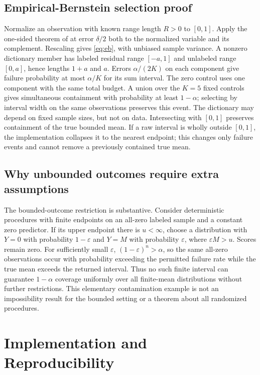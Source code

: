 \documentclass{article}
\begin{document}
\subsection{Empirical-Bernstein selection proof}
Normalize an observation with known range length $R>0$ to $[0,1]$. Apply the one-sided theorem of \citet{eb} at error $\delta/2$ both to the normalized variable and its complement. Rescaling gives \cref{eq:eb}, with unbiased sample variance. A nonzero dictionary member has labeled residual range $[-a,1]$ and unlabeled range $[0,a]$, hence lengths $1+a$ and $a$. Errors $\alpha/(2K)$ on each component give failure probability at most $\alpha/K$ for its sum interval. The zero control uses one component with the same total budget. A union over the $K=5$ fixed controls gives simultaneous containment with probability at least $1-\alpha$; selecting by interval width on the same observations preserves this event. The dictionary may depend on fixed sample sizes, but not on data. Intersecting with $[0,1]$ preserves containment of the true bounded mean. If a raw interval is wholly outside $[0,1]$, the implementation collapses it to the nearest endpoint; this changes only failure events and cannot remove a previously contained true mean.

\subsection{Why unbounded outcomes require extra assumptions}
The bounded-outcome restriction is substantive. Consider deterministic procedures with finite endpoints on an all-zero labeled sample and a constant zero predictor. If its upper endpoint there is $u<\infty$, choose a distribution with $Y=0$ with probability $1-\varepsilon$ and $Y=M$ with probability $\varepsilon$, where $\varepsilon M>u$. Scores remain zero. For sufficiently small $\varepsilon$, $(1-\varepsilon)^n>\alpha$, so the same all-zero observations occur with probability exceeding the permitted failure rate while the true mean exceeds the returned interval. Thus no such finite interval can guarantee $1-\alpha$ coverage uniformly over all finite-mean distributions without further restrictions. This elementary contamination example is not an impossibility result for the bounded setting or a theorem about all randomized procedures.

\section{Implementation and Reproducibility}
\end{document}
